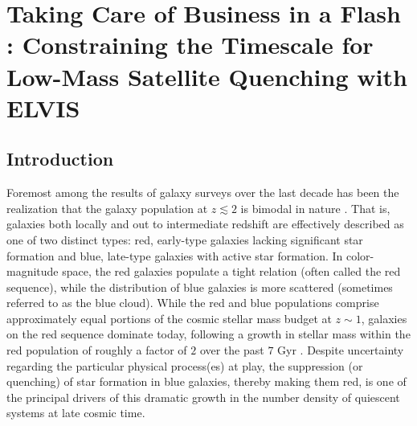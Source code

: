 
\newcommand{\vcirc}{v_{\rm{circ}}}
\newcommand{\vmax}{V_{\rm{max}}}
\newcommand{\rmax}{R_{\rm{max}}}
\newcommand{\mhalf}{M_{1/2}}
\newcommand{\rhalf}{R_{1/2}}
\newcommand{\mmax}{M_{\rm max}}
\newcommand{\msub}{M_{\rm{sub}}}
\newcommand{\mvir}{M_{\rm{vir}}}
\newcommand{\mhalo}{{M}_{\rm{halo}}}
\newcommand{\mpeak}{{M}_{\rm{peak}}}
\newcommand{\rvir}{R_{\rm{vir}}}
\newcommand{\vvir}{V_{\rm{vir}}}
\newcommand{\dd}{{\rm d}}
\newcommand{\mstar}{{\rm M}_{\star}}
\newcommand{\lstar}{L^{*}}
\newcommand{\msun}{{\rm M}_{\odot}}
\newcommand{\lsun}{L_{\odot}}
\newcommand{\mpc}{{\rm Mpc}}
\newcommand{\kpc}{{\rm kpc}}
\newcommand{\kms}{{\rm km \, s}^{-1}}
\newcommand{\millen}{MS-I}
\newcommand{\msii}{MS-II}
\newcommand{\lcdm}{$\Lambda$CDM}
\newcommand{\diso}{d_{\rm iso}}
\newcommand{\niso}{n_{\rm iso}}
\newcommand{\lt}{<}
\newcommand{\gt}{>}

\chapter{Taking Care of Business in a Flash \Lightning:  
Constraining the Timescale for Low-Mass Satellite Quenching with ELVIS
}


\section{Introduction}
\label{sec:intro} 

Foremost among the results of galaxy surveys over the last decade has
been the realization that the galaxy population at $z \lesssim 2$ is
bimodal in nature \citep[e.g.][]{strateva01, baldry04, bell04,
  cooper06}. That is, galaxies both locally and out to intermediate
redshift are effectively described as one of two distinct types: red,
early-type galaxies lacking significant star formation and blue,
late-type galaxies with active star formation. In color-magnitude
space, the red galaxies populate a tight relation (often called the
red sequence), while the distribution of blue galaxies is more
scattered (sometimes referred to as the blue cloud).
%
While the red and blue populations comprise approximately equal
portions of the cosmic stellar mass budget at $z \sim 1$, galaxies on
the red sequence dominate today, following a growth in stellar mass
within the red population of roughly a factor of $2$ over the past $7$
Gyr \citep{bell04, bundy06, faber07, brown07}.
%
Despite uncertainty regarding the particular physical process(es) at play,
the suppression (or quenching) of star formation in blue galaxies,
thereby making them red, is one of the principal drivers of this
dramatic growth in the number density of quiescent systems at late
cosmic time.


